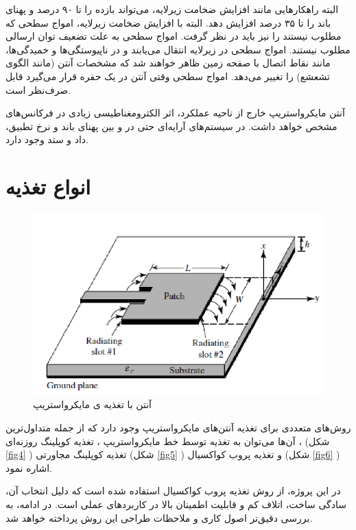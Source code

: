 البته راهکارهایی مانند افزایش ضخامت زیرلایه، می‌تواند بازده را تا ۹۰ درصد و پهنای باند را تا ۳۵ درصد افزایش دهد. البته با افزایش ضخامت زیرلایه، امواج سطحی
 که مطلوب نیستند را نیز باید در نظر گرفت. امواج سطحی به علت تضعیف توان ارسالی مطلوب نیستند. امواج سطحی در زیرلایه انتقال می‌یابند و در ناپیوستگی‌ها و خمیدگی‌ها، مانند نقاط اتصال با صفحه زمین 
 ظاهر خواهند شد که مشخصات آنتن (مانند الگوی تشعشع) را تغییر می‌دهد. امواج سطحی وقتی آنتن در یک حفره قرار می‌گیرد قابل صرف‌نظر است.


آنتن مایکرواستریپ خارج از ناحیه عملکرد، اثر الکترومغناطیسی زیادی در فرکانس‌های مشخص خواهد داشت. در سیستم‌های آرایه‌ای حتی در
 و
 بین پهنای باند و نرخ تطبیق، داد و ستد
  وجود دارد.


\section{انواع تغذیه}
\begin{figure}
	\centering
	\includegraphics[scale=0.3]{Images/fig3.png}
	\caption{آنتن با تغذیه ی مایکرواستریپ}
	\label{fig3}
\end{figure}
روش‌های متعددی برای تغذیه آنتن‌های مایکرواستریپ وجود دارد که از جمله متداول‌ترین آن‌ها می‌توان به تغذیه توسط خط مایکرواستریپ
،
تغذیه کوپلینگ روزنه‌ای
،
 (شکل
\ref{fig4}
)
تغذیه کوپلینگ مجاورتی
(شکل
\ref{fig5}
)
و تغذیه پروب کواکسیال
 (شکل
\ref{fig6}
)
اشاره نمود.  


در این پروژه، از روش تغذیه پروب کواکسیال استفاده شده است که دلیل انتخاب آن، سادگی ساخت، اتلاف کم و قابلیت اطمینان بالا در کاربردهای عملی است. در ادامه، به بررسی دقیق‌تر اصول کاری و ملاحظات طراحی این روش پرداخته خواهد شد.

